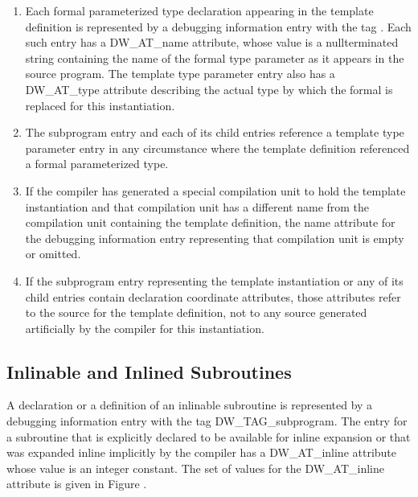 \begin{enumerate}[1.]
\item Each formal parameterized type declaration appearing in the
template definition is represented by a debugging information
entry with the 
tag . 
Each
such entry has a DW\-\_AT\-\_name attribute, whose value is a
null\dash terminated string containing the name of the formal
type parameter as it appears in the source program. The
template type parameter entry also has a DW\_AT\_type attribute
describing the actual type by which the formal is replaced
for this instantiation.

\item The subprogram entry and each of its child entries reference
a template type parameter entry in any circumstance where
the template definition referenced a formal parameterized type.

\item If the compiler has generated a special compilation unit
to hold the template instantiation and that compilation unit
has a different name from the compilation unit containing
the template definition, the name attribute for the debugging
information entry representing that compilation unit is empty
or omitted.

\item If the subprogram entry representing the template
instantiation or any of its child entries contain declaration
coordinate attributes, those attributes refer to the source
for the template definition, not to any source generated
artificially by the compiler for this instantiation.
\end{enumerate}



\subsection{Inlinable and Inlined Subroutines}
A declaration or a definition of an inlinable subroutine
is represented by a debugging information entry with the
tag DW\_TAG\_subprogram. The entry for a subroutine that is
explicitly declared to be available for inline expansion or
that was expanded inline implicitly by the compiler has a
DW\_AT\_inline attribute whose value is an integer constant. The
set of values for the DW\_AT\_inline attribute is given in
Figure .

